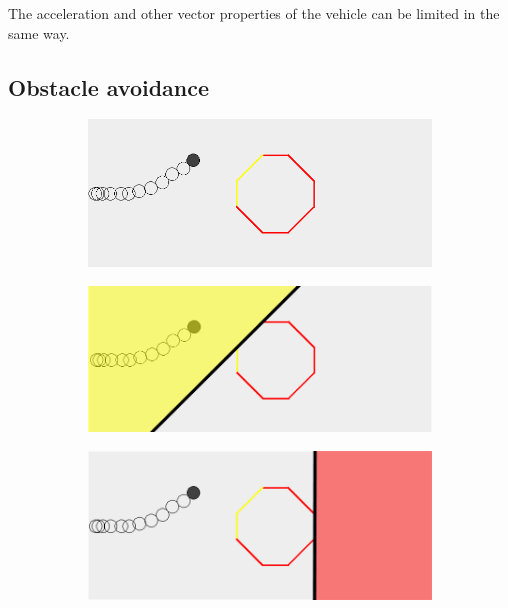 The acceleration and other vector properties of the vehicle can be limited in the same way. 
\subsection{Obstacle avoidance}
\label{subsec:obs-avoid}
\begin{figure}[!t]
    \centering
    
    \begin{subfigure}[t]{0.47\textwidth}
        \includegraphics[width=\textwidth]{img/obs1}
        \caption{}
    \end{subfigure}
    \hfil
    \begin{subfigure}[t]{0.47\textwidth}
        \includegraphics[width=\textwidth]{img/obs2}
        \caption{}
    \end{subfigure}
    \par\bigskip
    \begin{subfigure}[t]{0.47\textwidth}
        \includegraphics[width=\textwidth]{img/obs3}

\end{subfigure}
\end{figure}

